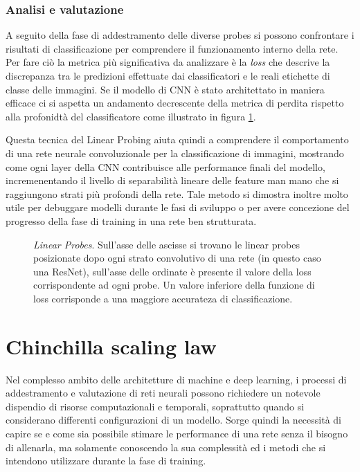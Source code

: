 \subsubsection{Analisi e valutazione}

A seguito della fase di addestramento delle diverse probes si possono confrontare i risultati di classificazione per comprendere il funzionamento interno della rete. Per fare ciò la metrica più significativa da analizzare è la \textit{loss} che descrive la discrepanza tra le predizioni effettuate dai classificatori e le reali etichette di classe delle immagini. Se il modello di CNN è stato architettato in maniera efficace ci si aspetta un andamento decrescente della metrica di perdita rispetto alla profonidtà del classificatore come illustrato in figura \ref{fig:probe}.

Questa tecnica del Linear Probing aiuta quindi a comprendere il comportamento di una rete neurale convoluzionale per la classificazione di immagini, mostrando come ogni layer della CNN contribuisce alle performance finali del modello, incremenentando il livello di separabilità lineare delle feature man mano che si raggiungono strati più profondi della rete. Tale metodo si dimostra inoltre molto utile per debuggare modelli durante le fasi di sviluppo o per avere concezione del progresso della fase di training in una rete ben strutturata. 

\begin{figure}[h!]
    \centering
    \caption{\textit{Linear Probes}. Sull'asse delle ascisse si trovano  le linear probes posizionate dopo ogni strato convolutivo di una rete (in questo caso una ResNet), sull'asse delle ordinate è presente il valore della loss corrispondente ad ogni probe. Un valore inferiore della funzione di loss corrisponde a una maggiore accurateza di classificazione.}
    \label{fig:probe}
\end{figure}

\section{Chinchilla scaling law}
\label{sec:chinchilla}

Nel complesso ambito delle architetture di machine e deep learning, i processi di addestramento e valutazione di reti neurali possono richiedere un notevole dispendio di risorse computazionali e temporali, soprattutto quando si considerano differenti configurazioni di un modello. Sorge quindi la necessità di capire se e come sia possibile 
stimare le performance di una rete senza il bisogno di allenarla, ma solamente conoscendo la sua complessità ed i metodi che si intendono utilizzare durante la fase di training. 

